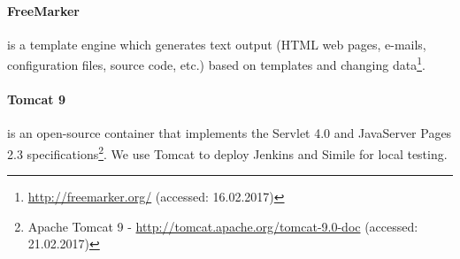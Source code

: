 \paragraph{FreeMarker}
is a template engine which generates text output (HTML web pages, e-mails, configuration files, source code, etc.) based on templates and changing data\footnote{\url{http://freemarker.org/} (accessed: 16.02.2017)}. 
\paragraph{Tomcat 9}
is an open-source container that implements the Servlet 4.0 and JavaServer Pages 2.3 specifications\footnote{Apache Tomcat 9 - \url{http://tomcat.apache.org/tomcat-9.0-doc} (accessed: 21.02.2017)}. We use Tomcat to deploy Jenkins and Simile for local testing.